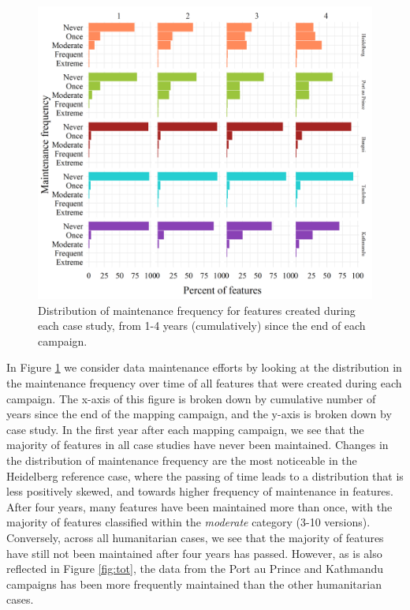 \begin{figure} %
    \centering %
    \includegraphics[width = \textwidth]{Images/facetmaint.png} %
    \caption[Distribution of maintenance frequency for features created during each case study.]{Distribution of maintenance frequency for features created during each case study, from 1-4 years (cumulatively) since the end of each campaign.} %
    \label{fig:dist} %
\end{figure}

In Figure \ref{fig:dist} we consider data maintenance efforts by looking at the distribution in the maintenance frequency over time of all features that were created during each campaign. The x-axis of this figure is broken down by cumulative number of years since the end of the mapping campaign, and the y-axis is broken down by case study. In the first year after each mapping campaign, we see that the majority of features in all case studies have never been maintained. Changes in the distribution of maintenance frequency are the most noticeable in the Heidelberg reference case, where the passing of time leads to a distribution that is less positively skewed, and towards higher frequency of maintenance in features. After four years, many features have been maintained more than once, with the majority of features classified within the \textit{moderate} category (3-10 versions). Conversely, across all humanitarian cases, we see that the majority of features have still not been maintained after four years has passed. However, as is also reflected in Figure \ref{fig:tot}, the data from the Port au Prince and Kathmandu campaigns has been more frequently maintained than the other humanitarian cases. 

